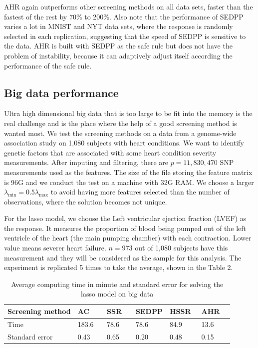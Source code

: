 AHR again outperforms other screening methods on all data sets, faster than the fastest of the rest by 70\% to 200\%. Also note that the performance of SEDPP varies a lot in MNIST and NYT data sets, where the response is randomly selected in each replication, suggesting that the speed of SEDPP is sensitive to the data. AHR is built with SEDPP as the safe rule but does not have the problem of instability, because it can adaptively adjust itself according the performance of the safe rule.



\subsection{Big data performance}

Ultra high dimensional big data that is too large to be fit into the memory is the real challenge and is the place where the help of a good screening method is wanted most. We test the screening methods on a data from a genome-wide association study on 1,080 subjects with heart conditions. We want to identify genetic factors that are associated with some heart condition severity measurements. After imputing and filtering, there are $p=11,830,470$ SNP measurements used as the features. The size of the file storing the feature matrix is 96G and we conduct the test on a machine with 32G RAM. We choose a larger $\lambda_{\min} =0.5\lambda_{\max}$ to avoid having more features selected than the number of observations, where the solution becomes not unique.

For the lasso model, we choose the Left ventricular ejection fraction (LVEF) as the response. It measures the proportion of blood being pumped out of the left ventricle of the heart (the main pumping chamber) with each contraction. Lower value means severer heart failure. $n=973$ out of 1,080 subjects have this measurement and they will be considered as the sample for this analysis. The experiment is replicated 5 times to take the average, shown in the Table 2.

\begin{table}[H]
\centering
\begin{tabular}{l|l|l|l|l|l}
\hline

Screening method & AC\,\,\,\,\,\,\,\,\,    & SSR\,\,\,\,\,\,   & SEDPP & HSSR\,\,\,  & AHR\,\,\,\,\,\,  \\
\hline
Time & 183.6 & 78.6 & 78.6 & 84.9 & 13.6\\
Standard error & 0.43 & 0.65 & 0.20 & 0.48 & 0.15
 \\\hline
\end{tabular}
\caption{Average computing time in minute and standard error for solving the lasso model on big data}
\end{table}

